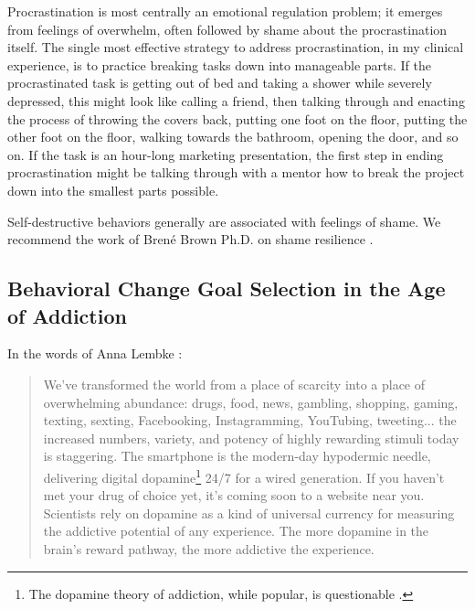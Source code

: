 \documentclass[12pt,letterpaper]{book}
\begin{document}
Procrastination is most centrally an emotional regulation problem; it emerges from feelings of overwhelm, often followed by shame about the procrastination itself. The single most effective strategy to address procrastination, in my clinical experience, is to practice breaking tasks down into manageable parts. If the procrastinated task is getting out of bed and taking a shower while severely depressed, this might look like calling a friend, then talking through and enacting the process of throwing the covers back, putting one foot on the floor, putting the other foot on the floor, walking towards the bathroom, opening the door, and so on. If the task is an hour-long marketing presentation, the first step in ending procrastination might be talking through with a mentor how to break the project down into the smallest parts possible.

Self-destructive behaviors generally are associated with feelings of shame. We recommend the work of Brené Brown Ph.D. on shame resilience \cite{brownThought}.

\subsection*{Behavioral Change Goal Selection in the Age of Addiction}
In the words of Anna Lembke \cite{lembke2021dopamine}:
\begin{quotation}
    We've transformed the world from a place of scarcity into a place of overwhelming abundance: drugs, food, news, gambling, shopping, gaming, texting, sexting, Facebooking, Instagramming, YouTubing, tweeting... the increased numbers, variety, and potency of highly rewarding stimuli today is staggering. The smartphone is the modern-day hypodermic needle, delivering digital dopamine\footnote{The dopamine theory of addiction, while popular, is questionable \cite{nutt2015dopamine}.} 24/7 for a wired generation. If you haven't met your drug of choice yet, it's coming soon to a website near you. Scientists rely on dopamine as a kind of universal currency for measuring the addictive potential of any experience. The more dopamine in the brain's reward pathway, the more addictive the experience.
\end{quotation}
\end{document}
